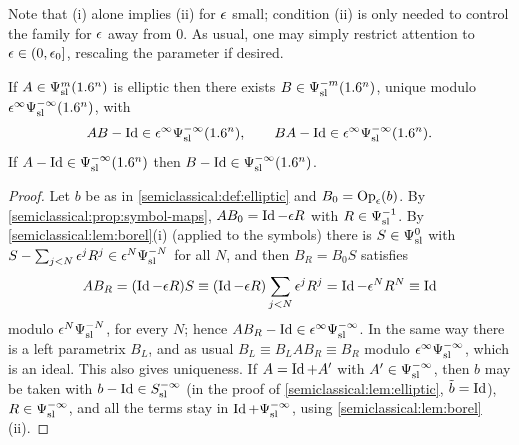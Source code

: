 Note that (i) alone implies (ii) for $\epsilon$ small; condition (ii) is only needed
to control the family for $\epsilon$ away from $0$. As usual, one may simply restrict
attention to $\epsilon\in(0,\epsilon_0]$, rescaling the parameter if desired.

\begin{theorem}\label{semiclassical:thm:parametrix}
  If $A\in\Psi^{m}_{\mathrm{sl}}(1.6^n)$ is elliptic then there exists $B\in\Psi^{-m}_{\mathrm{sl}}(1.6^n)$,
  unique modulo $\epsilon^\infty\Psi^{-\infty}_{\mathrm{sl}}(1.6^n)$, with
  \begin{equation*}
    AB-\operatorname{Id}\in\epsilon^\infty\Psi^{-\infty}_{\mathrm{sl}}(1.6^n),\qquad BA-\operatorname{Id}\in\epsilon^\infty\Psi^{-\infty}_{\mathrm{sl}}(1.6^n).
  \end{equation*}
  If $A-\operatorname{Id}\in\Psi^{-\infty}_{\mathrm{sl}}(1.6^n)$ then $B-\operatorname{Id}\in\Psi^{-\infty}_{\mathrm{sl}}(1.6^n)$.
\end{theorem}
\begin{proof}
  Let $b$ be as in \cref{semiclassical:def:elliptic} and $B_0=\operatorname{Op}_\epsilon(b)$. By
  \cref{semiclassical:prop:symbol-maps}, $AB_0=\operatorname{Id}-\epsilon R$ with $R\in\Psi^{-1}_{\mathrm{sl}}$.
  By \cref{semiclassical:lem:borel}(i) (applied to the symbols) there is
  $S\in\Psi^{0}_{\mathrm{sl}}$ with $S-\sum_{j<N}\epsilon^jR^j\in\epsilon^N\Psi^{-N}_{\mathrm{sl}}$ for all $N$, and then
  $B_R=B_0S$ satisfies
  \begin{equation*}
    AB_R=(\operatorname{Id}-\epsilon R)S\equiv(\operatorname{Id}-\epsilon R)\sum_{j<N}\epsilon^jR^j=\operatorname{Id}-\epsilon^NR^N\equiv\operatorname{Id}
  \end{equation*}
  modulo $\epsilon^N\Psi^{-N}_{\mathrm{sl}}$, for every $N$; hence
  $AB_R-\operatorname{Id}\in\epsilon^\infty\Psi^{-\infty}_{\mathrm{sl}}$. In the same way there is a left
  parametrix $B_L$, and as usual $B_L\equiv B_LAB_R\equiv B_R$ modulo
  $\epsilon^\infty\Psi^{-\infty}_{\mathrm{sl}}$, which is an ideal. This also gives uniqueness.
  If $A=\operatorname{Id}+A'$ with $A'\in\Psi^{-\infty}_{\mathrm{sl}}$, then $b$ may be taken with
  $b-\operatorname{Id}\in S^{-\infty}_{\mathrm{sl}}$ (in the proof of \cref{semiclassical:lem:elliptic}, $\tilde b=\operatorname{Id}$),
  $R\in\Psi^{-\infty}_{\mathrm{sl}}$, and all the terms stay in $\operatorname{Id}+\Psi^{-\infty}_{\mathrm{sl}}$, using
  \cref{semiclassical:lem:borel}(ii).
\end{proof}

